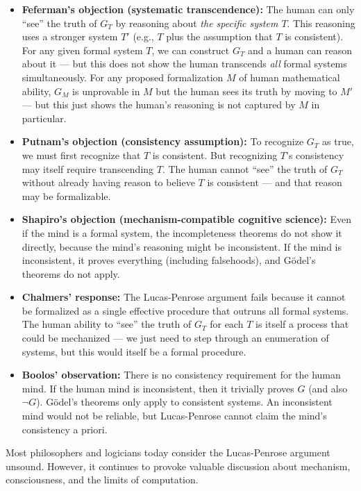 \begin{itemize}
\item \textbf{Feferman's objection (systematic transcendence):} The human can only ``see'' the truth of $G_T$ by reasoning about \emph{the specific system $T$}. This reasoning uses a stronger system $T'$ (e.g., $T$ plus the assumption that $T$ is consistent). For any given formal system $T$, we can construct $G_T$ and a human can reason about it --- but this does not show the human transcends \emph{all} formal systems simultaneously. For any proposed formalization $M$ of human mathematical ability, $G_M$ is unprovable in $M$ but the human sees its truth by moving to $M'$ --- but this just shows the human's reasoning is not captured by $M$ in particular.

\item \textbf{Putnam's objection (consistency assumption):} To recognize $G_T$ as true, we must first recognize that $T$ is consistent. But recognizing $T$'s consistency may itself require transcending $T$. The human cannot ``see'' the truth of $G_T$ without already having reason to believe $T$ is consistent --- and that reason may be formalizable.

\item \textbf{Shapiro's objection (mechanism-compatible cognitive science):} Even if the mind is a formal system, the incompleteness theorems do not show it directly, because the mind's reasoning might be inconsistent. If the mind is inconsistent, it proves everything (including falsehoods), and Gödel's theorems do not apply.

\item \textbf{Chalmers' response:} The Lucas-Penrose argument fails because it cannot be formalized as a single effective procedure that outruns all formal systems. The human ability to ``see'' the truth of $G_T$ for each $T$ is itself a process that could be mechanized --- we just need to step through an enumeration of systems, but this would itself be a formal procedure.

\item \textbf{Boolos' observation:} There is no consistency requirement for the human mind. If the human mind is inconsistent, then it trivially proves $G$ (and also $\neg G$). Gödel's theorems only apply to consistent systems. An inconsistent mind would not be reliable, but Lucas-Penrose cannot claim the mind's consistency a priori.
\end{itemize}

Most philosophers and logicians today consider the Lucas-Penrose argument unsound. However, it continues to provoke valuable discussion about mechanism, consciousness, and the limits of computation.

